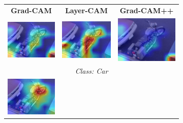 \begin{figure}[H]
  \centering
  \setlength{\tabcolsep}{1pt}
  \renewcommand{\arraystretch}{0.7}

  \begin{subfigure}[t]{0.48\textwidth}
    \centering
    \begin{tabular}{c c c}
      {\scriptsize \textbf{Grad-CAM}} & {\scriptsize \textbf{Layer-CAM}} & {\scriptsize \textbf{Grad-CAM++}} \\[2pt]
      \includegraphics[width=0.28\linewidth, height=0.28\linewidth]{figures/cams/gradcam/2008_007558_6} &
      \includegraphics[width=0.28\linewidth, height=0.28\linewidth]{figures/cams/layercam/2008_007558_6} &
      \includegraphics[width=0.28\linewidth, height=0.28\linewidth]{figures/cams/gradcampp/2008_007558_6} \\
      \multicolumn{3}{c}{{\scriptsize \textit{Class: Car}}} \\[2pt]
      \includegraphics[width=0.28\linewidth, height=0.28\linewidth]{figures/cams/gradcam/2008_007558_13} &

\end{tabular}
\end{subfigure}
\end{figure}
